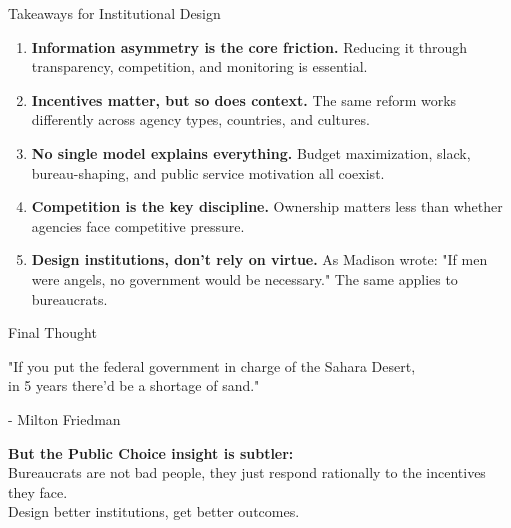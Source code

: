 \documentclass[10pt]{beamer}
\begin{document}
\begin{frame}{Takeaways for Institutional Design}
\begin{enumerate}
\item \textbf{Information asymmetry is the core friction.} Reducing it through transparency, competition, and monitoring is essential.


\item \textbf{Incentives matter, but so does context.} The same reform works differently across agency types, countries, and cultures.


\item \textbf{No single model explains everything.} Budget maximization, slack, bureau-shaping, and public service motivation all coexist.


\item \textbf{Competition is the key discipline.} Ownership matters less than whether agencies face competitive pressure.


\item \textbf{Design institutions, don't rely on virtue.} As Madison wrote: "If men were angels, no government would be necessary." The same applies to bureaucrats.
\end{enumerate}
\end{frame}

\begin{frame}{Final Thought}
\begin{center}
\Large 
"If you put the federal government in charge of the Sahara Desert, \\
in 5 years there'd be a shortage of sand."


\normalsize
- Milton Friedman
\end{center}


\begin{center}
\normalsize
\textbf{But the Public Choice insight is subtler:}\\[0.3cm]
Bureaucrats are not bad people, they just respond rationally to the incentives they face.\\[0.3cm]
\alert{Design better institutions, get better outcomes.}
\end{center}
\end{frame}
\end{document}
